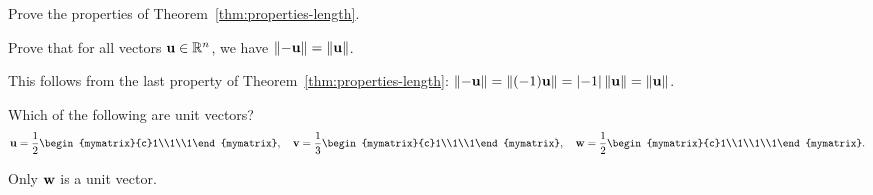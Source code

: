 \begin{ex}
  Prove the properties of Theorem~\ref{thm:properties-length}.
\end{ex}

\begin{ex}
  Prove that for all vectors $\mbox{\bf u}\in\mathbb{R}^n$, we have
  $\left\|-\mbox{\bf u}\right\| = \left\|\mbox{\bf u}\right\|$. 
  \begin{sol}
    This follows from the last property of
    Theorem~\ref{thm:properties-length}: $\left\|-\mbox{\bf u}\right\| =
    \left\|(-1)\mbox{\bf u}\right\| = \left|-1\right|\left\|\mbox{\bf u}\right\| = \left\|\mbox{\bf u}\right\|$.
  \end{sol}
\end{ex}

\begin{ex}
  Which of the following are unit vectors?
  \begin{equation*}
    \vect{u}=\frac{1}{2}\begin{mymatrix}{c}1\\1\\1\end{mymatrix}, \quad
    \vect{v}=\frac{1}{3}\begin{mymatrix}{c}1\\1\\1\end{mymatrix}, \quad
    \vect{w}=\frac{1}{2}\begin{mymatrix}{c}1\\1\\1\\1\end{mymatrix}.
  \end{equation*}
  \begin{sol}
    Only $\mbox{\bf w}$ is a unit vector.
  \end{sol}
\end{ex}

